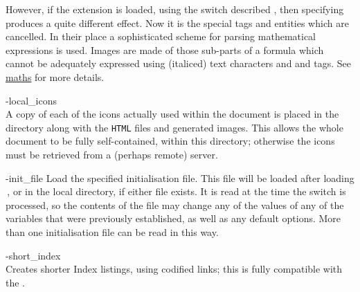 \begin{htmllist}
\begin{changebar}
However, if the  extension is loaded, 
using the  switch described ,
then specifying  produces a quite different effect.
Now it is the special  tags and entities which are cancelled. 
In their place a sophisticated scheme for parsing mathematical expressions 
is used. Images are made of those sub-parts of a formula which cannot be 
adequately expressed using (italiced) text characters and  and
 tags.
See \hyperref{the subsection on mathematics}{Section~}{}{maths} for more details.

%

\item [-local\_icons\label{localicons}]
\\
A copy of each of the icons actually used within the document is placed in the
directory along with the \texttt{HTML} files and generated images.
This allows the whole document to be fully self-contained, within this directory;
otherwise the icons must be retrieved from a (perhaps remote) server.
\end{changebar}


%
%

\item [ -init\_file \Meta{file}\label{initfile}]
Load the specified initialisation file. This \Perl{} file will be loaded after loading 
\,, or  in the local
directory, if either file exists. It is read at the time the switch is processed,
so the contents of the file may change any of the values of any of the
variables that were previously established, as well as any default options.
More than one initialisation file can be read in this way.%

%

\begin{changebar}\noindent
\item [ -short\_index\label{shortindex}]
\\
Creates shorter Index listings, using codified links; 
this is fully compatible with the  .
\end{changebar}

%
%


\end{htmllist}
